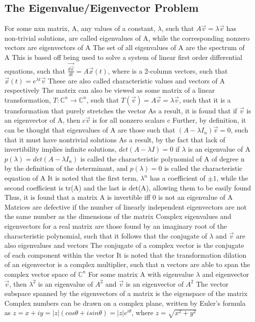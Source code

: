 \documentclass[11 pt, twoside]{article}
\newenvironment{outline*}
{
	\begin{outline}[enumerate]
	}
	{\end{outline}
}
\begin{document}
\subsection{The Eigenvalue/Eigenvector Problem}
\begin{outline*}
\1 For some nxn matrix, A, any values of a constant, $\lambda$, such that $A\vec{v} = \lambda\vec{v}$ has non-trivial solutions, are called eigenvalues of A, while the corresponding nonzero vectors are eigenvectors of A
\2 The set of all eigenvalues of A are the spectrum of A
\2 This is based off being used to solve a system of linear first order differential equations, such that $\vec{\frac{d\vec{x}}{dt}} = A\vec{x}(t)$, where  is a 2-column vectors, such that $\vec{x}(t) = e^{\lambda t}\vec{v}$
\2 These are also called characteristic values and vectors of A respectively
\2 The matrix can also be viewed as some matrix of a linear transformation, $T: \mathbb{C}^n \to \mathbb{C}^n$, such that $T(\vec{v}) = A\vec{v} = \lambda \vec{v}$, such that it is a transformation that purely stretches the vector
\3 As a result, it is found that if $\vec{v}$ is an eigenvector of A, then $c\vec{v}$ is for all nonzero scalars c
\2 Further, by definition, it can be thought that eigenvalues of A are those such that $(A - \lambda I_n)\vec{v} = 0$, such that it must have nontrivial solutions
\3 As a result, by the fact that lack of invertibility implies infinite solutions, $det(A - \lambda I) = 0$ if $\lambda$ is an eigenvalue of A
\3 $p(\lambda) = det(A - \lambda I_n)$ is called the characteristic polynomial of A of degree n by the definition of the determinant, and $p(\lambda) = 0$ is called the characteristic equation of A
\4 It is noted that the first term, $\lambda^n$ has a coefficient of $\pm 1$, while the second coefficient is tr(A) and the last is det(A), allowing them to be easily found
\3 Thus, it is found that a matrix A is invertible iff 0 is not an eigenvalue of A
\2 Matrices are defective if the number of linearly independent eigenvectors are not the same number as the dimensions of the matrix
\2 Complex eigenvalues and eigenvectors for a real matrix are those found by an imaginary root of the characteristic polynomial, such that it follows that the conjugate of $\lambda$ and $\vec{v}$ are also eigenvalues and vectors
\3 The conjugate of a complex vector is the conjugate of each component within the vector
\3 It is noted that the transformation dilation of an eigenvector is a complex multiplier, such that n vectors are able to span the complex vector space of $\mathbb{C}^n$
\2 For some matrix A with eigenvalue $\lambda$ and eigenvector $\vec{v}$, then $\lambda^2$ is an eigenvalue of $A^2$ and $\vec{v}$ is an eigenvector of $A^2$
\1 The vector subspace spanned by the eigenvectors of a matrix is the eigenspace of the matrix
\1 Complex numbers can be drawn on a complex plane, written by Euler's formula as $z = x + iy = |z|(cos\theta + isin\theta) = |z|e^{i\theta}$, where $z = \sqrt{x^2 + y^2}$
\end{outline*}
\end{document}
